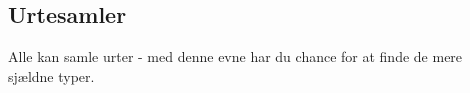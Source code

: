 \subsection*{Urtesamler}
Alle kan samle urter - med denne evne har du chance for at finde de mere sjældne typer.